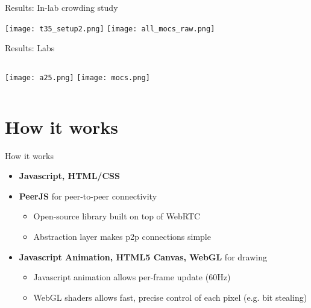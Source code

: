 \documentclass[10pt]{beamer}
\begin{document}

\begin{frame}{Results: In-lab crowding study}
    \begin{center}
    \texttt{[image: t35\_setup2.png]}
        \pause
    \texttt{[image: all\_mocs\_raw.png]}
    \end{center}
\end{frame}


\begin{frame}{Results: Labs}
    \begin{columns}[c]
    \texttt{[image: a25.png]}
        \texttt{[image: mocs.png]}
  \end{columns}
\end{frame}

\section{How it works}

\begin{frame}{How it works}
    \begin{itemize}[<+->]
        \item \textbf{Javascript, HTML/CSS}
        \item \textbf{PeerJS} for peer-to-peer connectivity
            \begin{itemize}[]
                \item Open-source library built on top of WebRTC
                \item Abstraction layer makes p2p connections simple
            \end{itemize}
        \item \textbf{Javascript Animation, HTML5 Canvas, WebGL} for drawing
            \begin{itemize}
                \item Javascript animation allows per-frame update (60Hz)
                \item WebGL shaders allows fast, precise control of each pixel (e.g. bit stealing)
            \end{itemize}
    \end{itemize}
\end{frame}
\end{document}
